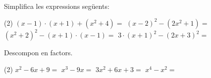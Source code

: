 \begin{mylist}
\begin{tasks}
\end{tasks}

\exer  Simplifica les expressions següents:
\begin{tasks}(2)
	\task  $\left(x-1\right)\cdot \left(x+1\right)+\left(x^{2} +4\right)=$  	      
	\task  $\left(x-2\right)^{2} -\left(2x^{2} +1\right)=$	
	\task  $\left(x^{2} +2\right)^{2} -\left(x+1\right)\cdot \left(x-1\right)=$   	    
	\task  $3\cdot \left(x+1\right)^{2} -\left(2x+3\right)^{2} =$
\end{tasks}

\exer  Descompon en factors.
\begin{tasks}(2)
	\task $x^{2} -6x+9=$                                                             
	\task   $x^{3} -9x=$	
	\task  $3x^{2} +6x+3=$                                                              
	\task  $x^{4} -x^{2} =$
\end{tasks}

 \end{mylist}
 

 

 

